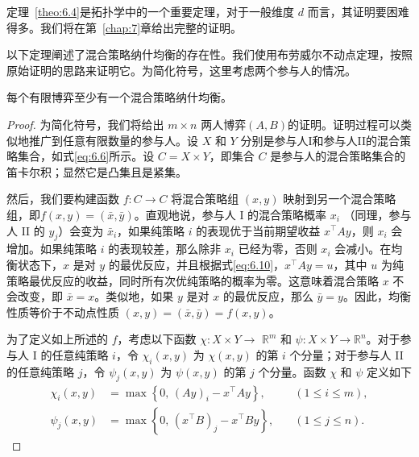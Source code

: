 定理~\ref{theo:6.4}是拓扑学中的一个重要定理，对于一般维度 \(d\) 而言，其证明要困难得多。我们将在第~\ref{chap:7}章给出完整的证明。

以下定理阐述了混合策略纳什均衡的存在性。我们使用布劳威尔不动点定理，按照 \citet{nash1951} 原始证明的思路来证明它。为简化符号，这里考虑两个参与人的情况。

\begin{theorem}  \label{theo:6.5}  %
    每个有限博弈至少有一个混合策略纳什均衡。
\end{theorem}

\begin{proof}
    为简化符号，我们将给出 \(m \times  n\) 两人博弈$(A, B)$的证明。证明过程可以类似地推广到任意有限数量的参与人。设 \(X\) 和 \(Y\) 分别是参与人I和参与人II的混合策略集合，如式\eqref{eq:6.6}所示。设 \(C = X \times  Y\)，即集合 \(C\) 是参与人的混合策略集合的笛卡尔积；显然它是凸集且是紧集。

然后，我们要构建函数 \(f : C \rightarrow  C\) 将混合策略组 $(x, y)$ 映射到另一个混合策略组，即\(f\left( {x,y}\right)  = \left( {\bar{x},\bar{y}}\right)\)。直观地说，参与人 I 的混合策略概率 \({x}_{i}\) （同理，参与人 II 的 \({y}_{j}\)）会变为 \({\bar{x}}_{i}\)，如果纯策略 \(i\) 的表现优于当前期望收益 \({x}^{\top }{Ay}\)，则 \({x}_{i}\) 会增加。如果纯策略 \(i\) 的表现较差，那么除非 \({x}_{i}\) 已经为零，否则 \({x}_{i}\) 会减小。在均衡状态下，\(x\) 是对 \(y\) 的最优反应，并且根据式\eqref{eq:6.10}，\({x}^{\top }{Ay} = u\)，其中 \(u\) 为纯策略最优反应的收益，同时所有次优纯策略的概率为零。这意味着混合策略 \(x\) 不会改变，即 \(\bar{x} = x\)。类似地，如果 \(y\) 是对 \(x\) 的最优反应，那么 \(\bar{y} = y\)。因此，均衡性质等价于不动点性质 \(\left( {x,y}\right)  = \left( {\bar{x},\bar{y}}\right)  = f\left( {x,y}\right)\)。

为了定义如上所述的 \(f\)，考虑以下函数 \(\chi  : X \times  Y \rightarrow\)  \({\mathbb{R}}^{m}\) 和 \(\psi  : X \times  Y \rightarrow  {\mathbb{R}}^{n}\)。对于参与人 I 的任意纯策略 \(i\)，令 \({\chi }_{i}\left( {x,y}\right)\) 为 \(\chi \left( {x,y}\right)\) 的第 \(i\) 个分量；对于参与人 II 的任意纯策略 \(j\)，令 \({\psi }_{j}\left( {x,y}\right)\) 为 \(\psi \left( {x,y}\right)\) 的第 \(j\) 个分量。函数 \(\chi\) 和 \(\psi\) 定义如下
\begin{equation}
\label{eq:6.21}
\begin{aligned}
\chi_i(x,y)
&= \max \left\{ 0,\,(Ay)_i - x^{\top}Ay \right\},
\quad &(1 \le i \le m), \\
\psi_j(x,y)
&= \max \left\{ 0,\,(x^{\top}B)_j - x^{\top}By \right\},
\quad &(1 \le j \le n).
\end{aligned}
\end{equation}




\end{proof}
